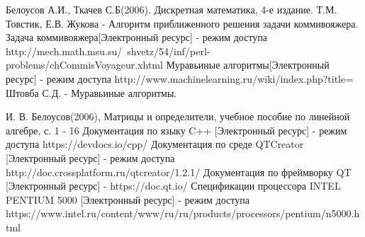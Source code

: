 \documentclass[a4paper, 14pt]{article}
\begin{document}
    \begin{center}
    	\newpage
        
        \begin{thebibliography}{}
	 Белоусов А.И., Ткачев С.Б(2006). Дискретная математика, 4-е издание.
	 Т.М. Товстик, Е.В. Жукова - Алгоритм приближенного решения задачи коммивояжера.
	 Задача коммивояжера[Электронный ресурс] - режим доступа http://mech.math.msu.su/~shvetz/54/inf/perl-problems/chCommisVoyageur.xhtml
	 Муравьиные алгоритмы[Электронный ресурс] - режим доступа http://www.machinelearning.ru/wiki/index.php?title=%
	 Штовба С.Д. - Муравьиные алгоритмы.

	 И. В. Белоусов(2006), Матрицы и определители, учебное пособие по линейной алгебре, с. 1 - 16
	 Документация по языку C++ [Электронный ресурс] - режим доступа https://devdocs.io/cpp/
	 Документация по среде QTCreator [Электронный ресурс] - режим доступа http://doc.crossplatform.ru/qtcreator/1.2.1/	
	 Документация по фреймворку QT [Электронный ресурс] - https://doc.qt.io/
	 Спецификации процессора INTEL PENTIUM 5000 [Электронный ресурс] - режим доступа https://www.intel.ru/content/www/ru/ru/products/processors/pentium/n5000.html

	\end{thebibliography}
	
	
	
        
    \end{center}        
\end{document}
